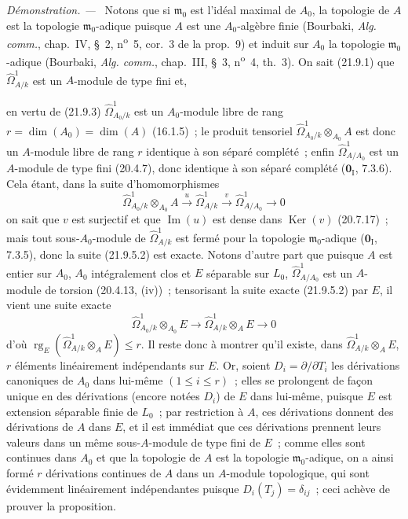 \documentclass[10pt,oneside]{book}
\newcommand{\oldpage}[2][]{%
  \setcounter{footnote}{0}%
  \marginpar{\scriptsize\textbf{#1}~|~#2}\ignorespaces}
\newenvironment{proof}{%
  \par\medskip\noindent\textit{Démonstration. ---\ }}{\par}
\begin{document}
\begin{proof}
Notons que si $\mathfrak m_0$ est l'idéal maximal de $A_0$, la topologie de
$A$ est la topologie $\mathfrak m_0$-adique puisque $A$ est une
$A_0$-algèbre finie (Bourbaki, \emph{Alg. comm.}, chap.~IV, \S~2,
n\textsuperscript{o}~5, cor.~3 de la prop.~9) et induit sur $A_0$ la topologie
$\mathfrak m_0$-adique (Bourbaki, \emph{Alg. comm.}, chap.~III, \S~3,
n\textsuperscript{o}~4, th.~3). On sait (21.9.1) que
$\widehat\Omega^1_{A/k}$ est un $A$-module de type fini et,

\oldpage[0\textsubscript{IV-1}]{178}
en vertu de (21.9.3) $\widehat\Omega^1_{A_0/k}$ est un $A_0$-module libre de
rang $r=\dim(A_0)=\dim(A)$ (16.1.5)~; le produit tensoriel
$\widehat\Omega^1_{A_0/k}\otimes_{A_0}A$ est donc un $A$-module libre de rang
$r$ identique à son séparé complété~; enfin $\widehat\Omega^1_{A/A_0}$ est
un $A$-module de type fini (20.4.7), donc identique à son séparé complété
($\mathbf 0_{\mathrm I}$, 7.3.6). Cela étant, dans la suite d'homomorphismes
\begin{equation}
\tag{21.9.5.2}
\label{0.21.9.5.2-fr}
  \widehat\Omega^1_{A_0/k}\otimes_{A_0}A
  \xrightarrow{u}\widehat\Omega^1_{A/k}
  \xrightarrow{v}\widehat\Omega^1_{A/A_0}\longrightarrow0
\end{equation}
on sait que $v$ est surjectif et que $\operatorname{Im}(u)$ est dense dans
$\operatorname{Ker}(v)$ (20.7.17)~; mais tout sous-$A_0$-module de
$\widehat\Omega^1_{A/k}$ est fermé pour la topologie $\mathfrak m_0$-adique
($\mathbf 0_{\mathrm I}$, 7.3.5), donc la suite (21.9.5.2) est exacte. Notons
d'autre part que puisque $A$ est entier sur $A_0$, $A_0$ intégralement clos
et $E$ séparable sur $L_0$, $\widehat\Omega^1_{A/A_0}$ est un $A$-module de
torsion (20.4.13, (iv))~; tensorisant la suite exacte (21.9.5.2) par $E$, il
vient une suite exacte
\[
  \widehat\Omega^1_{A_0/k}\otimes_{A_0}E
  \longrightarrow \widehat\Omega^1_{A/k}\otimes_AE\longrightarrow0
\]
d'où $\operatorname{rg}_E(\widehat\Omega^1_{A/k}\otimes_AE)\leqslant r$. Il
reste donc à montrer qu'il existe, dans $\widehat\Omega^1_{A/k}\otimes_AE$,
$r$ éléments linéairement indépendants sur $E$. Or, soient
$D_i=\partial/\partial T_i$ les dérivations canoniques de $A_0$ dans lui-même
$(1\leqslant i\leqslant r)$~; elles se prolongent de façon unique en des
dérivations (encore notées $D_i$) de $E$ dans lui-même, puisque $E$ est
extension séparable finie de $L_0$~; par restriction à $A$, ces dérivations
donnent des dérivations de $A$ dans $E$, et il est immédiat que ces
dérivations prennent leurs valeurs dans un même sous-$A$-module de type fini
de $E$~; comme elles sont continues dans $A_0$ et que la topologie de $A$ est
la topologie $\mathfrak m_0$-adique, on a ainsi formé $r$ dérivations
continues de $A$ dans un $A$-module topologique, qui sont évidemment
linéairement indépendantes puisque $D_i(T_j)=\delta_{ij}$~; ceci achève de
prouver la proposition.
\end{proof}
\end{document}
